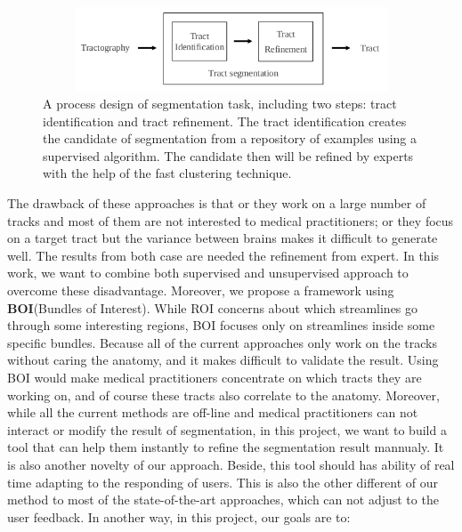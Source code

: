 \begin{figure}
  \centering
  \includegraphics[width=12.5cm, height=2.5cm ]{figures/segmentation.png}
  \caption{A process design of segmentation task, including two steps: tract identification and tract refinement. The tract identification creates the candidate of segmentation from a repository of examples using a supervised algorithm. The candidate then will be refined by experts with the help of the fast clustering technique.}
  \label{fig:ov_tool}
\end{figure}
The drawback of these approaches is that or they work on a large number of tracks and most of them are not interested to medical practitioners; or they focus on a target tract but the variance between brains makes it difficult to generate well. The results from both case are needed the refinement from expert. In this work, we want to combine both supervised and unsupervised approach to overcome these disadvantage. Moreover, we propose a framework using \textbf{BOI}(Bundles of Interest). While ROI concerns about which streamlines go through some interesting regions, BOI focuses only on streamlines inside some specific bundles. Because all of the current approaches only work on the tracks without caring the anatomy,
and it makes difficult to validate the result. Using BOI would make medical practitioners concentrate on which tracts they are working on, and of course these tracts also correlate to the anatomy. Moreover, while all the current methods are off-line and medical practitioners can not interact or modify the result of segmentation, in this project, we want to build a tool that can help them instantly to refine the segmentation result mannualy. It is also another novelty of our approach. Beside, this tool should has ability of real time adapting to the responding of users. This is also the other different of our method to most of the state-of-the-art approaches, which can not adjust to the user feedback. In another way, in this project, our goals are to:
